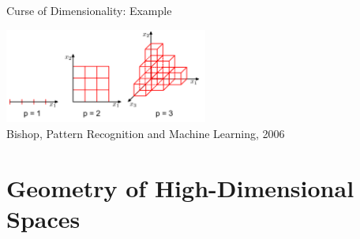 \documentclass[11pt,compress,t,notes=noshow, xcolor=table]{beamer}
\begin{document}
\begin{vbframe}{Curse of Dimensionality: Example}
\vspace*{-.2cm}

\begin{center}
\includegraphics[width = 0.5\textwidth]{figure_man/exponentialcubes.png}\\
\scriptsize{Bishop, Pattern Recognition and Machine Learning, 2006}
\end{center}

\end{vbframe}




\section{Geometry of High-Dimensional Spaces}
\end{document}
